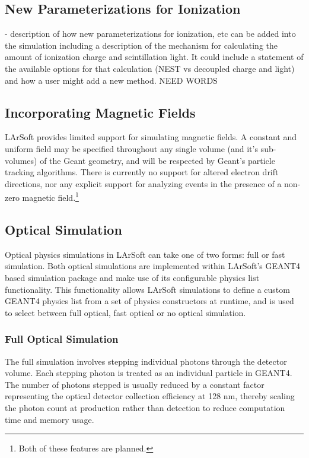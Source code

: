 \documentclass[12pt]{elsarticle}
\begin{document}
\subsection{New Parameterizations for Ionization}
- description of how new parameterizations for ionization, etc can be added into the simulation including a description of the mechanism for calculating the amount of ionization charge and scintillation light.  It could include a statement of the available options for that calculation (NEST vs decoupled charge and light) and how a user might add a new method.
NEED WORDS

\subsection{Incorporating Magnetic Fields}
LArSoft provides limited support for simulating magnetic
fields. A constant and uniform field may be specified
throughout any single volume (and it's sub-volumes) of the Geant
geometry, and will be respected by Geant's particle tracking
algorithms. There is currently no support for altered electron
drift directions, nor any explicit support for analyzing events
in the presence of a non-zero magnetic field.\footnote{Both of these features are planned.}

\subsection{Optical Simulation}
Optical physics simulations in LArSoft can take one of two forms: full or fast simulation.  Both optical simulations are implemented within LArSoft's GEANT4 based simulation package and make use of its configurable physics list functionality.  This functionality allows LArSoft simulations to define a custom GEANT4 physics list from a set of physics constructors at runtime, and is used to select between full optical, fast optical or no optical simulation. 

\subsubsection{Full Optical Simulation}
The full simulation involves stepping individual photons through the detector volume.  Each stepping photon is treated as an individual particle in GEANT4.  The number of photons stepped is usually reduced by a constant factor representing the optical detector collection efficiency at 128 nm, thereby scaling the photon count at production rather than detection to reduce computation time and memory usage. 
\end{document}
